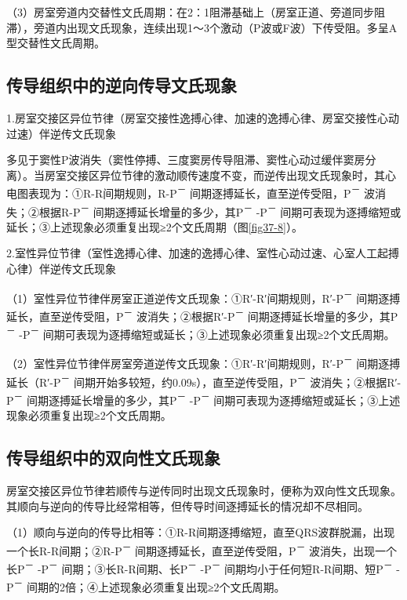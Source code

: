 （3）房室旁道内交替性文氏周期：在2：1阻滞基础上（房室正道、旁道同步阻滞），旁道内出现文氏现象，连续出现1～3个激动（P波或F波）下传受阻。多呈A型交替性文氏周期。

\protect\hypertarget{text00025.htmlux5cux23subid309}{}{}

\subsection{传导组织中的逆向传导文氏现象}

1.房室交接区异位节律（房室交接性逸搏心律、加速的逸搏心律、房室交接性心动过速）伴逆传文氏现象

多见于窦性P波消失（窦性停搏、三度窦房传导阻滞、窦性心动过缓伴窦房分离）。当房室交接区异位节律的激动顺传速度不变，而逆传出现文氏现象时，其心电图表现为：①R-R间期规则，R-P\textsuperscript{－}
间期逐搏延长，直至逆传受阻，P\textsuperscript{－}
波消失；②根据R-P\textsuperscript{－}
间期逐搏延长增量的多少，其P\textsuperscript{－} -P\textsuperscript{－}
间期可表现为逐搏缩短或延长；③上述现象必须重复出现≥2个文氏周期（图\ref{fig37-8}）。

2.室性异位节律（室性逸搏心律、加速的逸搏心律、室性心动过速、心室人工起搏心律）伴逆传文氏现象

（1）室性异位节律伴房室正道逆传文氏现象：①R′-R′间期规则，R′-P\textsuperscript{－}
间期逐搏延长，直至逆传受阻，P\textsuperscript{－}
波消失；②根据R′-P\textsuperscript{－}
间期逐搏延长增量的多少，其P\textsuperscript{－} -P\textsuperscript{－}
间期可表现为逐搏缩短或延长；③上述现象必须重复出现≥2个文氏周期。

（2）室性异位节律伴房室旁道逆传文氏现象：①R′-R′间期规则，R′-P\textsuperscript{－}
间期逐搏延长（R′-P\textsuperscript{－}
间期开始多较短，约0.09s），直至逆传受阻，P\textsuperscript{－}
波消失；②根据R′-P\textsuperscript{－}
间期逐搏延长增量的多少，其P\textsuperscript{－} -P\textsuperscript{－}
间期可表现为逐搏缩短或延长；③上述现象必须重复出现≥2个文氏周期。

\protect\hypertarget{text00025.htmlux5cux23subid310}{}{}

\subsection{传导组织中的双向性文氏现象}

房室交接区异位节律若顺传与逆传同时出现文氏现象时，便称为双向性文氏现象。其顺向与逆向的传导比经常相等，但传导时间逐搏延长的情况却不尽相同。

（1）顺向与逆向的传导比相等：①R-R间期逐搏缩短，直至QRS波群脱漏，出现一个长R-R间期；②R-P\textsuperscript{－}
间期逐搏延长，直至逆传受阻，P\textsuperscript{－}
波消失，出现一个长P\textsuperscript{－} -P\textsuperscript{－}
间期；③长R-R间期、长P\textsuperscript{－} -P\textsuperscript{－}
间期均小于任何短R-R间期、短P\textsuperscript{－} -P\textsuperscript{－}
间期的2倍；④上述现象必须重复出现≥2个文氏周期。

